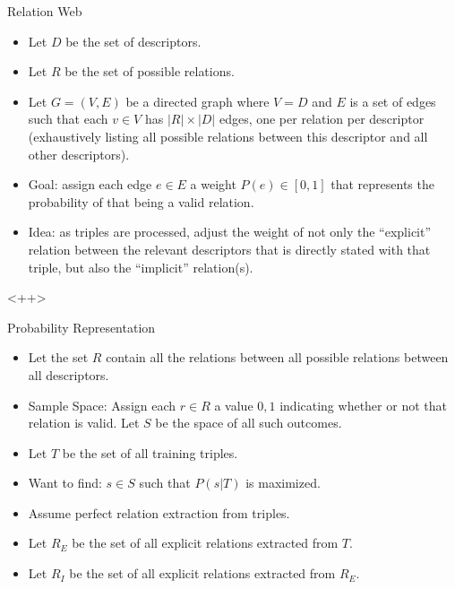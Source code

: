 \documentclass[a4paper]{article}
\begin{document}
Relation Web
\begin{itemize}
    \item Let $D$ be the set of descriptors.
    \item Let $R$ be the set of possible relations.
    \item Let $G = \left( V, E \right)$ be a directed graph where $V = D$ and
        $E$ is a set of edges such that each $v \in V$ has $|R| \times |D|$
        edges, one per relation per descriptor (exhaustively listing all 
        possible relations between this descriptor and all other descriptors).
    \item Goal: assign each edge $e \in E$ a weight $P(e) \in [0, 1]$ that
        represents the probability of that being a valid relation.
    \item Idea: as triples are processed, adjust the weight of not only the 
        ``explicit'' relation between the relevant descriptors that is directly
        stated with that triple, but also the ``implicit'' relation(s).
\end{itemize}<++>

Probability Representation
\begin{itemize}
    \item Let the set $R$ contain all the relations between all possible
        relations between all descriptors. 
    \item Sample Space: Assign each $r \in R$ a value $0, 1$ indicating whether
        or not that relation is valid. Let $S$ be the space of all such
        outcomes.
    \item Let $T$ be the set of all training triples.
    \item Want to find: $s \in S$ such that $P(s | T)$ is maximized.
    \item Assume perfect relation extraction from triples.
    \item Let $R_E$ be the set of all explicit relations extracted from $T$.
    \item Let $R_I$ be the set of all explicit relations extracted from $R_E$.
\end{itemize}
\end{document}
